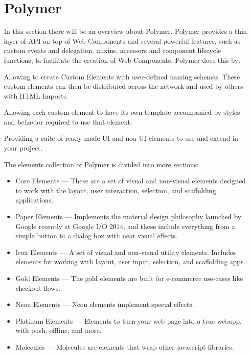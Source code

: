 \section{Polymer}
\label{sec:TCH_polymer}

In this section there will be an overview about Polymer. Polymer provides a thin layer of API on top of Web Components and several powerful features, such as custom events and delegation, mixins, accessors and component lifecycle functions, to facilitate the creation of Web Components. Polymer does this by:

Allowing to create Custom Elements with user-defined naming schemes. These custom elements can then be distributed across the network and used by others with HTML Imports.

Allowing each custom element to have its own template accompanied by styles and behavior required to use that element.

Providing a suite of ready-made UI and non-UI elements to use and extend in your project.

The elements collection of Polymer is divided into more sections:

\begin{itemize}

\item Core Elements — These are a set of visual and non-visual elements designed to work with the layout, user interaction, selection, and scaffolding applications.
\item Paper Elements — Implements the material design philosophy launched by Google recently at Google I/O 2014, and these include everything from a simple button to a dialog box with neat visual effects.
\item Iron Elements — A set of visual and non-visual utility elements. Includes elements for working with layout, user input, selection, and scaffolding apps.
\item Gold Elements — The gold elements are built for e-commerce use-cases like checkout flows.
\item Neon Elements — Neon elements implement special effects.
\item Platinum Elements — Elements to turn your web page into a true webapp, with push, offline, and more.
\item Molecules — Molecules are elements that wrap other javascript libraries.
\end{itemize}


